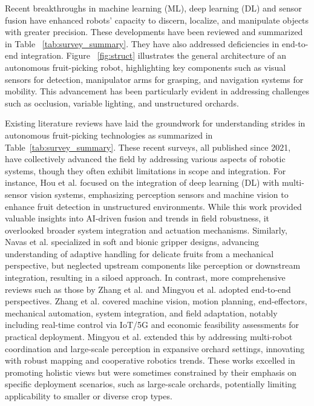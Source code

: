 \documentclass[a4paper,fleqn]{cas-dc}
\begin{document}
Recent breakthroughs in machine learning (ML), deep learning (DL) and sensor fusion have enhanced robots' capacity to discern, localize, and manipulate objects with greater precision. These developments have been reviewed and summarized in Table ~\ref{tab:survey_summary}. They have also addressed deficiencies in end-to-end integration.
 Figure ~\ref{fig:struct} illustrates the general architecture of an autonomous fruit-picking robot, highlighting key components such as visual sensors for detection, manipulator arms for grasping, and navigation systems for mobility. This advancement has been particularly evident in addressing challenges such as occlusion, variable lighting, and unstructured orchards.

Existing literature reviews have laid the groundwork for understanding strides in autonomous fruit-picking technologies as summarized in Table~\ref{tab:survey_summary}. These recent surveys, all published since 2021, have collectively advanced the field by addressing various aspects of robotic systems, though they often exhibit limitations in scope and integration.
For instance, Hou et al. \cite{hou2023overview} focused on the integration of deep learning (DL) with multi-sensor vision systems, emphasizing perception sensors and machine vision to enhance fruit detection in unstructured environments. While this work provided valuable insights into AI-driven fusion and trends in field robustness, it overlooked broader system integration and actuation mechanisms. Similarly, Navas et al. \cite{navas2021soft} specialized in soft and bionic gripper designs, advancing understanding of adaptive handling for delicate fruits from a mechanical perspective, but neglected upstream components like perception or downstream integration, resulting in a siloed approach.
In contrast, more comprehensive reviews such as those by Zhang et al. \cite{zhang2024automatic} and Mingyou et al. \cite{mingyou2024orchard} adopted end-to-end perspectives. Zhang et al. covered machine vision, motion planning, end-effectors, mechanical automation, system integration, and field adaptation, notably including real-time control via IoT/5G and economic feasibility assessments for practical deployment. Mingyou et al. extended this by addressing multi-robot coordination and large-scale perception in expansive orchard settings, innovating with robust mapping and cooperative robotics trends. These works excelled in promoting holistic views but were sometimes constrained by their emphasis on specific deployment scenarios, such as large-scale orchards, potentially limiting applicability to smaller or diverse crop types.
\end{document}
